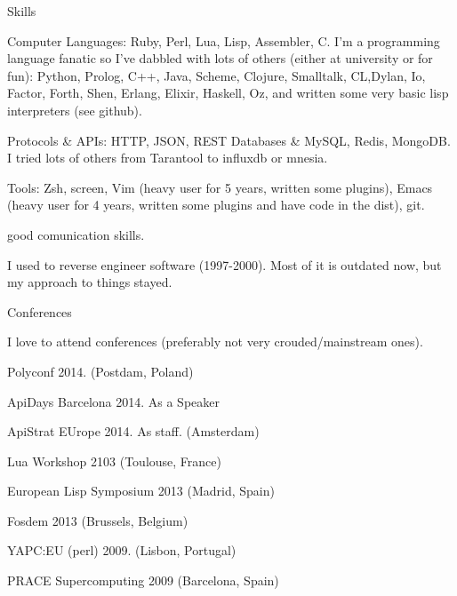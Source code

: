 \documentclass{resume} %
\begin{document}

\begin{rSection}{Skills}

\item Computer Languages: Ruby, Perl, Lua, Lisp, Assembler, C. I'm a programming language fanatic so I've dabbled with lots of others  (either at university or for fun): Python, Prolog, C++, Java, Scheme, Clojure, Smalltalk, CL,Dylan, Io, Factor, Forth, Shen, Erlang, Elixir, Haskell, Oz, and written some very basic lisp interpreters (see github).

\item Protocols \& APIs: HTTP, JSON, REST
Databases \& MySQL, Redis, MongoDB. I tried lots of others from Tarantool to influxdb or mnesia.
\item Tools: Zsh, screen, Vim (heavy user for 5 years, written some plugins), Emacs (heavy user for 4 years, written some plugins and have code in the dist), git.
\item good comunication skills.
\item I used to reverse engineer software (1997-2000). Most of it is outdated now, but my approach to things stayed.

\end{rSection}

\begin{rSection}{Conferences}

  I love to attend conferences (preferably not very crouded/mainstream ones).

\item Polyconf 2014. (Postdam, Poland)
\item ApiDays Barcelona 2014. As a Speaker
\item ApiStrat EUrope 2014. As staff. (Amsterdam)
\item Lua Workshop 2103 (Toulouse, France)
\item European Lisp Symposium 2013 (Madrid, Spain)
\item Fosdem 2013 (Brussels, Belgium)
\item YAPC:EU (perl) 2009. (Lisbon, Portugal)
\item PRACE Supercomputing 2009 (Barcelona, Spain)

\end{rSection}
\end{document}
